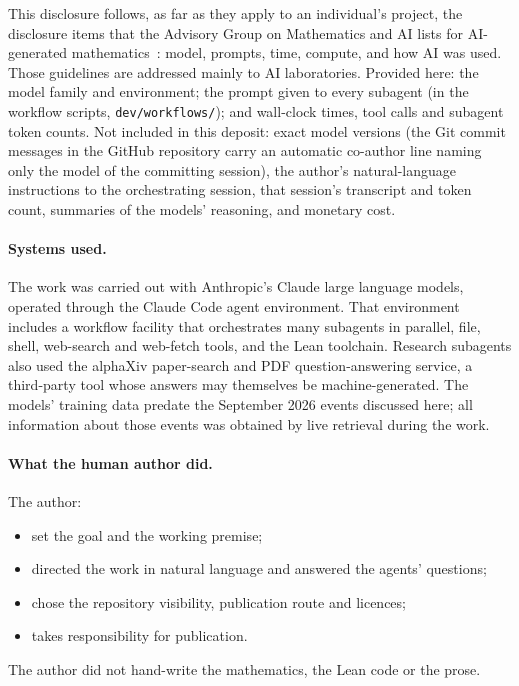 \documentclass[11pt]{article}
\theoremstyle{definition}
\theoremstyle{remark}
\newcommand{\lean}[1]{\texttt{\hyphenchar\font=-1\relax #1}}
\begin{document}
This disclosure follows, as far as they apply to an individual's project, the disclosure items
that the Advisory Group on Mathematics and AI lists for AI-generated mathematics~\cite{AGMAI2026a}:
model, prompts, time, compute, and how AI was used. Those guidelines are addressed mainly to AI
laboratories. Provided here: the model family and environment; the prompt given to every subagent
(in the workflow scripts, \lean{dev/workflows/}); and wall-clock times, tool calls and subagent
token counts. Not included in this deposit: exact model versions (the Git commit messages in the GitHub repository carry an automatic
co-author line naming only the model of the committing session), the author's natural-language
instructions to the orchestrating session, that session's transcript and token count, summaries of
the models' reasoning, and monetary cost.

\paragraph{Systems used.}
The work was carried out with Anthropic's Claude large language models, operated through the Claude
Code agent environment. That environment includes a workflow facility that orchestrates many
subagents in parallel, file, shell, web-search and web-fetch tools, and the Lean toolchain. Research
subagents also used the alphaXiv paper-search and PDF question-answering service, a third-party tool
whose answers may themselves be machine-generated. The models' training data predate the September
2026 events discussed here; all information about those events was obtained by live retrieval
during the work.

\paragraph{What the human author did.}
The author:
\begin{itemize}[leftmargin=*]
\item set the goal and the working premise;
\item directed the work in natural language and answered the agents' questions;
\item chose the repository visibility, publication route and licences;
\item takes responsibility for publication.
\end{itemize}
The author did not hand-write the mathematics, the Lean code or the prose.
\end{document}

